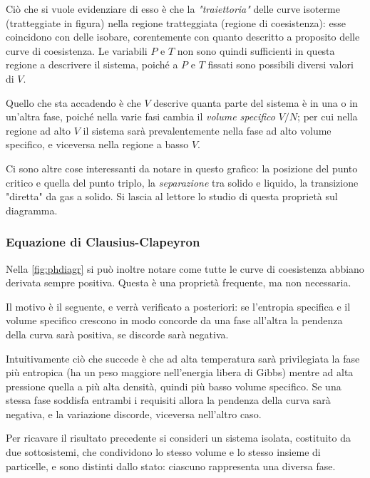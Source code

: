 Ciò che si vuole evidenziare di esso è che la \textit{"traiettoria"} delle curve isoterme (tratteggiate in figura) nella regione tratteggiata (regione di coesistenza): esse coincidono con delle isobare, corentemente con quanto descritto a proposito delle curve di coesistenza.
Le variabili $P$ e $T$ non sono quindi sufficienti in questa regione a descrivere il sistema, poiché a $P$ e $T$ fissati sono possibili diversi valori di $V$.

Quello che sta accadendo è che $V$ descrive quanta parte del sistema è in una o in un'altra fase, poiché nella varie fasi cambia il \textit{volume specifico} $V/N$; per cui nella regione ad alto $V$ il sistema sarà prevalentemente nella fase ad alto volume specifico, e viceversa nella regione a basso $V$.

Ci sono altre cose interessanti da notare in questo grafico: la posizione del punto critico e quella del punto triplo, la \textit{separazione} tra solido e liquido, la transizione "diretta" da gas a solido. Si lascia al lettore lo studio di questa proprietà sul diagramma.

\subsubsection{Equazione di Clausius-Clapeyron}

Nella \cref{fig:phdiagr} si può inoltre notare come tutte le curve di coesistenza abbiano derivata sempre positiva. Questa è una proprietà frequente, ma non necessaria.

Il motivo è il seguente, e verrà verificato a posteriori: se l'entropia specifica e il volume specifico crescono in modo concorde da una fase all'altra la pendenza della curva sarà positiva, se discorde sarà negativa.

Intuitivamente ciò che succede è che ad alta temperatura sarà privilegiata la fase più entropica (ha un peso maggiore nell'energia libera di Gibbs) mentre ad alta pressione quella a più alta densità, quindi più basso volume specifico. Se una stessa fase soddisfa entrambi i requisiti allora la pendenza della curva sarà negativa, e la variazione discorde, viceversa nell'altro caso. 
\newline

Per ricavare il risultato precedente si consideri un sistema isolata, costituito da due sottosistemi, che condividono lo stesso volume e lo stesso insieme di particelle, e sono distinti dallo stato: ciascuno rappresenta una diversa fase.

